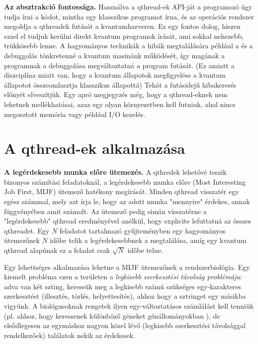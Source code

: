 \indent \textbf{Az absztrakció fontossága.} Használva a qthread-ek API-ját a programozó úgy tudja írni a kódot, mintha egy klasszikus programot írna, és az operációs rendszer megoldja a qthreadek futását a kvantumharveren.
Ez egy fontos dolog, hiszen ezzel el tudjuk kerülni direkt kvantum programok írását, ami sokkal nehezebb, trükkösebb lenne.
A hagyományos technikák a hibák megtalálására például a  és a  debuggolás tönkretenné a kvantum masinánk működését, így magának a programnak a debuggolása megváltoztatná a program futását.
(Ez amiatt a diszciplína miatt van, hogy a kvantum állapotok megfigyelése a kvantum állapotot összeomlasztja klasszikus állapottá)
Tehát a futásidejű hibakeresés előnyét elveszítjük.
Egy apró megjegyzés még, hogy a qthread-eknek nem lehetnek mellékhatásai, azaz egy olyan környezetben kell futniuk, ahol nincs megosztott memória vagy például I/O kezelés.

\section{A qthread-ek alkalmazása}

\textbf{A legérdekesebb munka előre ütemezés.} A qthredek lehetővé teszik bizonyos számítási feladatoknál, a legérdekesebb munka előre (Most Interesting Job First, MIJF) ütemező hatékony megírását.
Minden qthread visszatér egy egész számmal, mely azt írja le, hogy az adott munka "mennyire" érdekes, annak függvényében amit számolt.
Az ütemező pedig simán visszatérne a "legérdekesebb" qthread eredményével anélkül, hogy explicite lefuttatná az összes qthreadet.
Egy $N$ feladatot tartalmazó gyűjteményben egy hagyományos ütemezőnek $N$ időbe telik a legérdekesebbnek a megtalálása, amíg egy kvantum qthread alapúnak ez a feladat csak $\sqrt{N}$ időbe telne.

\indent Egy lehettséges alkalmazása lehetne a MIJF ütemezőnek a rendszerbiológia. Egy kiemelt probléma ezen a területen a \textit{legkisebb szerkesztési távolság problémája}: adva van két szting, keressük meg a legkisebb számú szükséges egy-karakteres szerkesztést (illesztés, törlés, helyettesítés), ahhoz hogy a sztringet egy másikba vigyünk.
A biológusoknak rengetek ilyen egy-változtatásos számlálást kell tenniük (pl. ahhoz, hogy keressenek különböző géneket génállományokban ), de elsődlegesen az egymáshoz nagyon közel lévő (legkisebb szerkesztési távolsággal rendelkezőek) találatok nekik az érdekesek.

